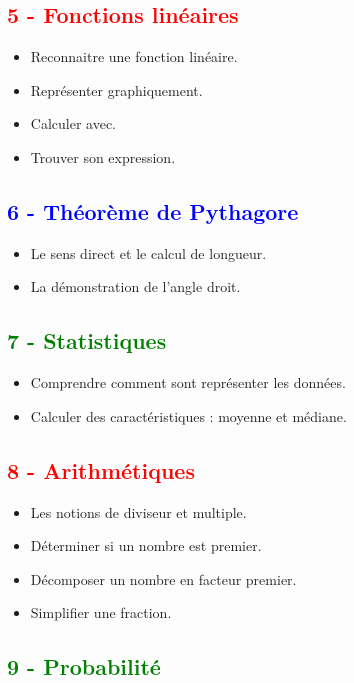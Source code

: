 \documentclass[11pt]{article}
\begin{document}
\begin{multicols}{2}
\subsection*{\textcolor{red}{5 - Fonctions linéaires}}

\begin{itemize}
\item Reconnaitre une fonction linéaire.
\item Représenter graphiquement. 
\item Calculer avec.
\item Trouver son expression.
\end{itemize}

\subsection*{\textcolor{blue}{6 - Théorème de Pythagore}}

\begin{itemize}
\item Le sens direct et le calcul de longueur.
\item La démonstration de l'angle droit.
\end{itemize}

\subsection*{\textcolor{green}{7 - Statistiques}}

\begin{itemize}
\item Comprendre comment sont représenter les données.
\item Calculer des caractéristiques : moyenne et médiane.
\end{itemize}

\subsection*{\textcolor{red}{8 - Arithmétiques}}

\begin{itemize}
\item Les notions de diviseur et multiple.
\item Déterminer si un nombre est premier.
\item Décomposer un nombre en facteur premier.
\item Simplifier une fraction.
\end{itemize}

\subsection*{\textcolor{green}{9 - Probabilité}}


\end{multicols}
\end{document}
